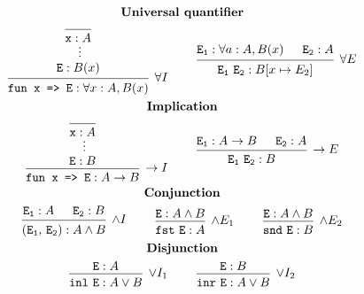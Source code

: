 \documentclass[convert, border=2pt, varwidth=8in]{standalone}
\begin{document}
\begin{spreadlines}{2em}
\begin{gather*}
\textbf{Universal quantifier} \\
\begin{prooftree}
    \infer0{\mathtt{x} : A}
    \ellipsis{}{\mathtt{E} : B(x)}
    \infer1[$\forall I$]{\texttt{fun x => E} : \forall x : A, B(x)}
\end{prooftree}
~ \qquad
\begin{prooftree}
   \hypo{\mathtt{E_1} : \forall a : A, B(x)}
   \hypo{\mathtt{E_2} : A}
   \infer2[$\forall E$]{\mathtt{E_1 \,\, E_2} : B[x \mapsto E_2]} 
\end{prooftree}
\\ \textbf{Implication} \\
\begin{prooftree}
    \infer0{\mathtt{x} : A}
    \ellipsis{}{\mathtt{E} : B}
    \infer1[$\rightarrow I$]{\texttt{fun x => E} : A \rightarrow B}
\end{prooftree}
~ \qquad
\begin{prooftree}
   \hypo{\mathtt{E_1} : A \rightarrow B}
   \hypo{\mathtt{E_2} : A}
   \infer2[$\rightarrow E$]{\mathtt{E_1 \,\, E_2} : B} 
\end{prooftree}
\\ \textbf{Conjunction} \\
\begin{prooftree}
    \hypo{\mathtt{E_1} : A}
    \hypo{\mathtt{E_2} : B}
    \infer2[$\wedge I$]{\mathtt{(E_1, \, E_2)} : A \wedge B}
\end{prooftree}
~ \qquad
\begin{prooftree}
    \hypo{\mathtt{E} : A \wedge B}
    \infer1[$\wedge E_1$]{\mathtt{fst \,\, E} : A}
\end{prooftree}
~ \qquad
\begin{prooftree}
    \hypo{\mathtt{E} : A \wedge B}
    \infer1[$\wedge E_2$]{\mathtt{snd \,\, E} : B}
\end{prooftree}
\\ \textbf{Disjunction} \\
\begin{prooftree}
    \hypo{\mathtt{E} : A}
    \infer1[$\vee I_1$]{\mathtt{inl \,\, E} : A \vee B}
\end{prooftree}
~ \qquad
\begin{prooftree}
    \hypo{\mathtt{E} : B}
    \infer1[$\vee I_2$]{\mathtt{inr \,\, E} : A \vee B}
\end{prooftree}
\\

\end{gather*}
\end{spreadlines}
\end{document}
